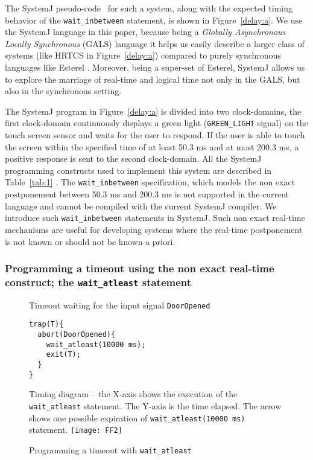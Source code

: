 The SystemJ pseudo-code~\cite{amal10} for such a system, along with the
expected timing behavior of the \texttt{wait\-\_inbetween} statement, is
shown in Figure~\ref{delay:a}. We use the SystemJ language in this
paper, because being a \textit{Globally Asynchronous Locally
Synchronous} (GALS) language it helps us easily describe a larger class
of systems (like HRTCS in Figure~\ref{delay:a}) compared to purely
synchronous languages like Esterel \cite{gber931}. Moreover, being a
super-set of Esterel, SystemJ allows us to explore the marriage of
real-time and logical time not only in the GALS, but also in the
synchronous setting.

The SystemJ program in Figure~\ref{delay:a} is divided into two
 clock-domains, the first clock-domain
continuously displays a green light (\texttt{GREEN\_LIGHT} signal) on
the touch screen sensor and waits for the user to respond. If the user
is able to touch the screen within the specified time of at least 50.3
ms and at most 200.3 ms, a positive response is sent to the second
clock-domain. All the SystemJ programming constructs used to implement
this system are described in Table~\ref{tab:1} . The \texttt{wait\_inbetween}
specification, which models the non exact postponement between 50.3 ms
and 200.3 ms is not supported in the current language and cannot be
compiled with the current SystemJ compiler. We introduce such
\texttt{wait\_inbetween} statements in SystemJ. Such non exact real-time
mechanisms are useful for developing systems where the real-time
postponement is not known or should not be known a priori.

\subsubsection{Programming a timeout using the non exact real-time
  construct; the \texttt{wait\_atleast} statement}
\label{sec:progr-time-using}

\begin{figure}[b!]
	\centering
	\vspace{-10pt}
        \begin{SubFloat}{\label{dd:a}Timeout waiting for the input
            signal \texttt{DoorOpened}}
        \begin{lstlisting}[style=sysj,morekeywords={abort,await,emit,present,trap,pause,exit,wait_atleast,suspend}]
trap(T){
  abort(DoorOpened){
    wait_atleast(10000 ms);
    exit(T);  
  }
}
\end{lstlisting}
\end{SubFloat}
\begin{SubFloat}{\label{dd:b}Timing diagram -- the X-axis shows the
    execution of the \texttt{wait\_atleast} statement. The Y-axis is the
    time elapsed. The arrow shows one possible expiration of
    \texttt{wait\_atleast(10000 ms)} statement.}
\texttt{[image: FF2]}
\end{SubFloat}
\caption{Programming a timeout with \texttt{wait\_atleast}}
\label{dd}
\end{figure}

